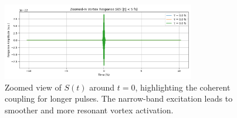 \documentclass{article}
\begin{document}
\begin{figure}[h!]
  \centering
  \includegraphics[width=0.75\textwidth]{images/vam_time_response_zoom_plot}
  \caption{Zoomed view of $S(t)$ around $t = 0$, highlighting the coherent coupling for longer pulses. The narrow-band excitation leads to smoother and more resonant vortex activation.}
\end{figure}
\end{document}
